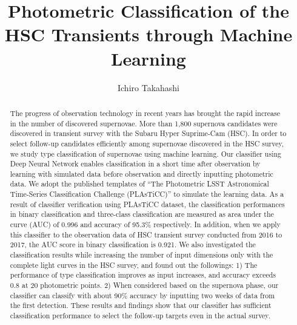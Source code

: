 \documentclass[useamsfonts]{pasj01}
\begin{document}
\title{Photometric Classification of the HSC Transients through Machine Learning}
\author{Ichiro Takahashi}%


\maketitle
%

\begin{abstract}
The progress of observation technology in recent years has brought the rapid increase in the number of discovered supernovae. More than 1,800 supernova candidates were discovered in transient survey with the Subaru Hyper Suprime-Cam (HSC). In order to select follow-up candidates efficiently among supernovae discovered in the HSC survey, we study type classification of supernovae using machine learning. Our classifier using Deep Neural Network enables classification in a short time after observation by learning with simulated data before observation and directly inputting photometric data. We adopt the published templates of “The Photometric LSST Astronomical Time-Series Classification Challenge (PLAsTiCC)” to simulate the learning data. As a result of classifier verification using PLAsTiCC dataset, the classification performances in binary classification and three-class classification are measured as area under the curve (AUC) of 0.996 and accuracy of 95.3\% respectively. In addition, when we apply this classifier to the observation data of HSC transient survey conducted from 2016 to 2017, the AUC score in binary classification is 0.921. We also investigated the classification results while increasing the number of input dimensions only with the complete light curves in the HSC survey, and found out the followings: 1) The performance of type classification improves as input increases, and accuracy exceeds 0.8 at 20 photometric points. 2) When considered based on the supernova phase, our classifier can classify with about 90\% accuracy by inputting two weeks of data from the first detection. These results and findings show that our classifier has sufficient classification performance to select the follow-up targets even in the actual survey.
\end{abstract}
\end{document}

